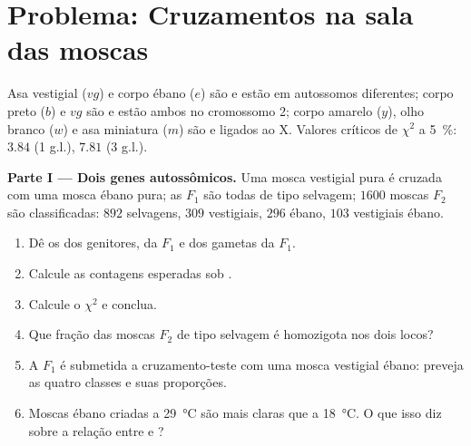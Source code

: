 \section{Problema: Cruzamentos na sala das moscas}

\begin{problem}
\label{pb:b2:meiosis-heredity:1}
Asa vestigial ($vg$) e corpo ébano ($e$) são  e estão em
autossomos diferentes; corpo preto ($b$) e $vg$ são  e estão
ambos no cromossomo 2; corpo amarelo ($y$), olho branco ($w$) e asa
miniatura ($m$) são  e ligados ao X. Valores críticos de
$\chi^2$ a \qty{5}{\%}: $3.84$ (1 g.l.), $7.81$ (3 g.l.).

\medskip
\noindent\textbf{Parte I --- Dois genes autossômicos.}
Uma mosca vestigial pura é cruzada com uma mosca ébano pura; as $F_1$
são todas de tipo selvagem; $1600$ moscas $F_2$ são classificadas:
$892$ selvagens, $309$ vestigiais, $296$ ébano, $103$ vestigiais
ébano.
\begin{enumerate}
  \item Dê os  dos genitores, da $F_1$ e dos gametas
        da $F_1$.
  \item Calcule as contagens esperadas sob .
  \item Calcule o $\chi^2$ e conclua.
  \item Que fração das moscas $F_2$ de tipo selvagem é homozigota nos
        dois locos?
  \item A $F_1$ é submetida a cruzamento-teste com uma mosca vestigial
        ébano: preveja as quatro classes e suas proporções.
  \item Moscas ébano criadas a \qty{29}{\celsius} são mais claras que a
        \qty{18}{\celsius}. O que isso diz sobre a relação entre
         e ?
\end{enumerate}


\end{problem}
